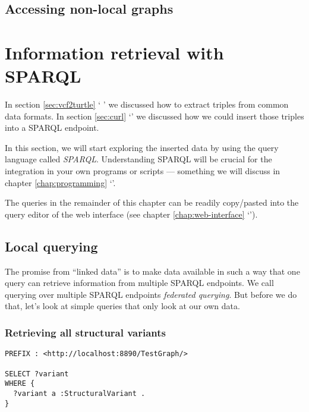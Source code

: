 \documentclass[11pt,a4paper,oneside]{book}
\begin{document}
\section{Accessing non-local graphs}

\chapter{Information retrieval with SPARQL}

  In section \ref{sec:vcf2turtle} {\color{LinkGray}`%
  '} we discussed how to extract
  triples from common data formats.  In section \ref{sec:curl}
  {\color{LinkGray}`'} we discussed how we could insert
  those triples into a SPARQL endpoint.

  In this section, we will start exploring the inserted data by using the
  query language called \emph{SPARQL}.  Understanding SPARQL will be crucial
  for the integration in your own programs or scripts --- something we will
  discuss in chapter \ref{chap:programming}
  {\color{LinkGray}`'}.

  The queries in the remainder of this chapter can be readily copy/pasted into
  the query editor of the web interface (see chapter \ref{chap:web-interface}
  {\color{LinkGray}`'}).

\section{Local querying}

  The promise from ``linked data'' is to make data available in such a way that
  one query can retrieve information from multiple SPARQL endpoints.  We call
  querying over multiple SPARQL endpoints \emph{federated querying}.  But before
  we do that, let's look at simple queries that only look at our own data.

\subsection{Retrieving all structural variants}
\begin{siderules}
\begin{verbatim}
PREFIX : <http://localhost:8890/TestGraph/>

SELECT ?variant
WHERE {
  ?variant a :StructuralVariant .
}
\end{verbatim} 
\end{siderules}
\end{document}
